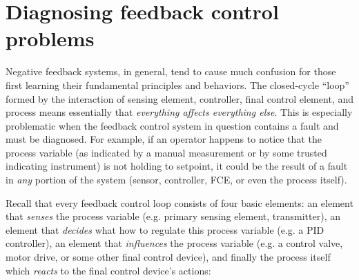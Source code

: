 












\filbreak
\section{Diagnosing feedback control problems}

Negative feedback systems, in general, tend to cause much confusion for those first learning their fundamental principles and behaviors.  The closed-cycle ``loop'' formed by the interaction of sensing element, controller, final control element, and process means essentially that \textit{everything affects everything else}.  This is especially problematic when the feedback control system in question contains a fault and must be diagnosed.  For example, if an operator happens to notice that the process variable (as indicated by a manual measurement or by some trusted indicating instrument) is not holding to setpoint, it could be the result of a fault in \textit{any} portion of the system (sensor, controller, FCE, or even the process itself).

\vskip 10pt

Recall that every feedback control loop consists of four basic elements: an element that \textit{senses} the process variable (e.g. primary sensing element, transmitter), an element that \textit{decides} what how to regulate this process variable (e.g. a PID controller), an element that \textit{influences} the process variable (e.g. a control valve, motor drive, or some other final control device), and finally the process itself which \textit{reacts} to the final control device's actions:

